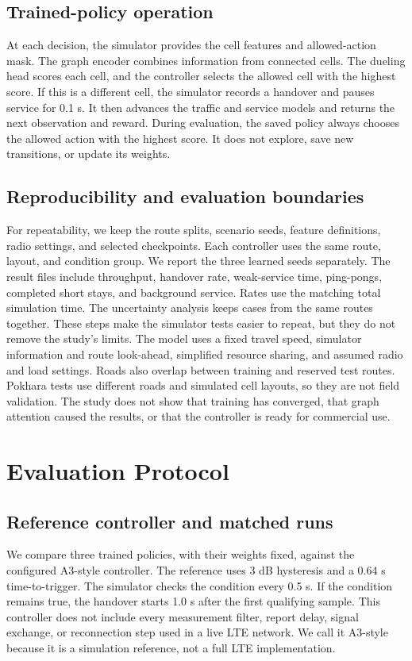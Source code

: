 \documentclass[fleqn,10pt,twoside]{IOEGC}
\begin{document}
\subsection{Trained-policy operation}
At each decision, the simulator provides the cell features and allowed-action mask. The graph encoder combines information from connected cells. The dueling head scores each cell, and the controller selects the allowed cell with the highest score. If this is a different cell, the simulator records a handover and pauses service for 0.1 s. It then advances the traffic and service models and returns the next observation and reward. During evaluation, the saved policy always chooses the allowed action with the highest score. It does not explore, save new transitions, or update its weights.

\subsection{Reproducibility and evaluation boundaries}
For repeatability, we keep the route splits, scenario seeds, feature definitions, radio settings, and selected checkpoints. Each controller uses the same route, layout, and condition group. We report the three learned seeds separately. The result files include throughput, handover rate, weak-service time, ping-pongs, completed short stays, and background service. Rates use the matching total simulation time. The uncertainty analysis keeps cases from the same routes together. These steps make the simulator tests easier to repeat, but they do not remove the study's limits. The model uses a fixed travel speed, simulator information and route look-ahead, simplified resource sharing, and assumed radio and load settings. Roads also overlap between training and reserved test routes. Pokhara tests use different roads and simulated cell layouts, so they are not field validation. The study does not show that training has converged, that graph attention caused the results, or that the controller is ready for commercial use.

\section{Evaluation Protocol}
\subsection{Reference controller and matched runs}
We compare three trained policies, with their weights fixed, against the configured A3-style controller. The reference uses 3 dB hysteresis and a 0.64 s time-to-trigger. The simulator checks the condition every 0.5 s. If the condition remains true, the handover starts 1.0 s after the first qualifying sample. This controller does not include every measurement filter, report delay, signal exchange, or reconnection step used in a live LTE network. We call it A3-style because it is a simulation reference, not a full LTE implementation.
\end{document}
